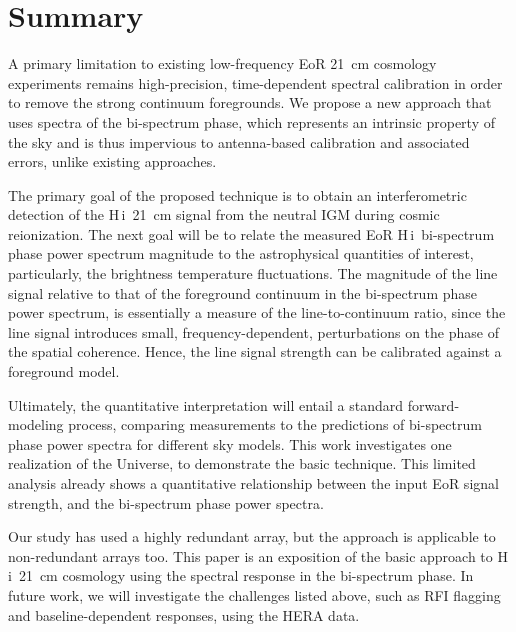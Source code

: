 \documentclass[
reprint,
superscriptaddress,
amsmath,
amssymb,
aps,
prd
]{revtex4-1}
\newcommand{\HI}{H\,{\sc i}}
\begin{document}
\section{Summary}\label{sec:summary}

A primary limitation to existing low-frequency EoR 21~cm cosmology experiments remains high-precision, time-dependent spectral calibration in order to remove the strong continuum foregrounds. We propose a new approach that uses spectra of the bi-spectrum phase, which represents an intrinsic property of the sky and is thus impervious to antenna-based calibration and associated errors, unlike existing approaches.
  
The primary goal of the proposed technique is to obtain an interferometric detection of the \HI\ 21~cm signal from the neutral IGM during cosmic reionization. The next goal will be to relate the measured EoR \HI\ bi-spectrum phase power spectrum magnitude to the astrophysical quantities of interest, particularly, the brightness temperature fluctuations. The magnitude of the line signal relative to that of the foreground continuum in the bi-spectrum phase power spectrum, is essentially a measure of the line-to-continuum ratio, since the line signal introduces small, frequency-dependent, perturbations on the phase of the spatial coherence. Hence, the line signal strength can be calibrated against a foreground model.

Ultimately, the quantitative interpretation will entail a standard forward-modeling process, comparing measurements to the predictions of bi-spectrum phase power spectra for different sky models. This work investigates one realization of the Universe, to demonstrate the basic technique. This limited analysis already shows a quantitative relationship between the input EoR signal strength, and the bi-spectrum phase power spectra.

Our study has used a highly redundant array, but the approach is applicable to non-redundant arrays too. This paper is an exposition of the basic approach to \HI\ 21~cm cosmology using the spectral response in the bi-spectrum phase. In future work, we will investigate the challenges listed above, such as RFI flagging and baseline-dependent responses, using the HERA data.

\end{document}
